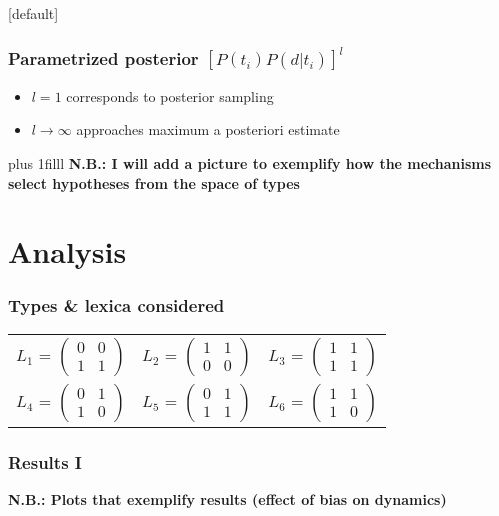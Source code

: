 \documentclass{beamer} %
\makeatletter
\newcommand{\vFill}{\vskip0pt plus 1filll}
\newenvironment{withoutheadline}{
        \setbeamertemplate{headline}[default]
        \def\beamer@entrycode{\vspace*{-\headheight}}
    }{}
\makeatother
\begin{document}
\begin{withoutheadline}
\begin{frame}
	\frametitle{Parametrized posterior $[P(t_i)P(d|t_i)]^l$}
\begin{itemize}\itemsep2em
	  \item $l = 1$ corresponds to posterior sampling
	  \item $l \to \infty$ approaches maximum a posteriori estimate 
	\end{itemize}
\vFill
{\bf N.B.: I will add a picture to exemplify how the mechanisms select hypotheses from the space of types}
\end{frame}


\section{Analysis}



\begin{frame}
	\frametitle{Types \& lexica considered}
\begin{table}
\centering 
\begin{tabular}{l c l}
$L_1$ = $\begin{pmatrix} 0 & 0 \\ 1 & 1 \end{pmatrix}$ & 
$L_2$ = $\begin{pmatrix} 1 & 1 \\ 0 & 0 \end{pmatrix}$ & 
$L_3$ = $\begin{pmatrix} 1 & 1 \\ 1 & 1 \end{pmatrix}$\\[0.5cm]

$L_4$ = $\begin{pmatrix} 0 & 1 \\ 1 & 0 \end{pmatrix}$ &
$L_5$ = $\begin{pmatrix} 0 & 1 \\ 1 & 1 \end{pmatrix}$ &
$L_6$ = $\begin{pmatrix} 1 & 1 \\ 1 & 0 \end{pmatrix}$

\end{tabular}
\end{table}
\end{frame}


\begin{frame}
	\frametitle{Results I}
{\bf N.B.: Plots that exemplify results (effect of bias on dynamics)}


\end{frame}
\end{withoutheadline}
\end{document}
